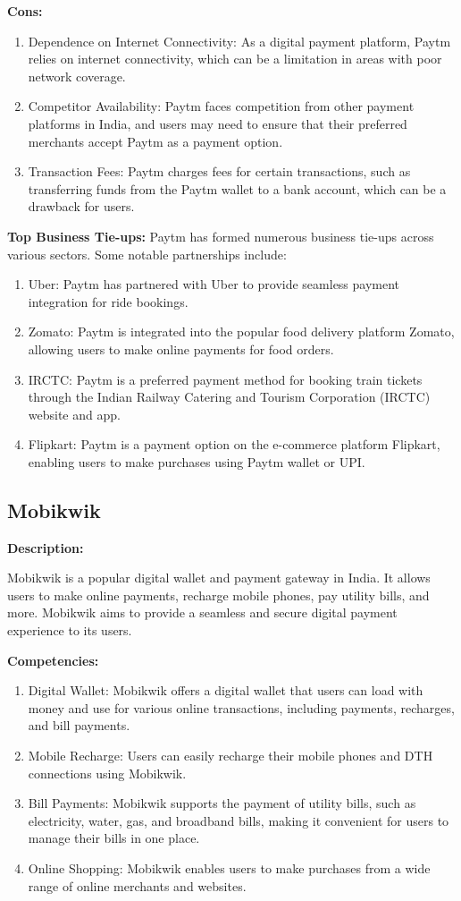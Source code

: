 \textbf{Cons:}
\begin{enumerate}
  \item Dependence on Internet Connectivity: As a digital payment platform, Paytm relies on internet connectivity, which can be a limitation in areas with poor network coverage.
  \item Competitor Availability: Paytm faces competition from other payment platforms in India, and users may need to ensure that their preferred merchants accept Paytm as a payment option.
  \item Transaction Fees: Paytm charges fees for certain transactions, such as transferring funds from the Paytm wallet to a bank account, which can be a drawback for users.
\end{enumerate}

\textbf{Top Business Tie-ups:}
Paytm has formed numerous business tie-ups across various sectors. Some notable partnerships include:
\begin{enumerate}
  \item Uber: Paytm has partnered with Uber to provide seamless payment integration for ride bookings.
  \item Zomato: Paytm is integrated into the popular food delivery platform Zomato, allowing users to make online payments for food orders.
  \item IRCTC: Paytm is a preferred payment method for booking train tickets through the Indian Railway Catering and Tourism Corporation (IRCTC) website and app.
  \item Flipkart: Paytm is a payment option on the e-commerce platform Flipkart, enabling users to make purchases using Paytm wallet or UPI.
\end{enumerate}

\subsection{Mobikwik}

\textbf{Description:}

Mobikwik is a popular digital wallet and payment gateway in India. It allows users to make online payments, recharge mobile phones, pay utility bills, and more. Mobikwik aims to provide a seamless and secure digital payment experience to its users.

\textbf{Competencies:}

\begin{enumerate}
  \item Digital Wallet: Mobikwik offers a digital wallet that users can load with money and use for various online transactions, including payments, recharges, and bill payments.
  \item Mobile Recharge: Users can easily recharge their mobile phones and DTH connections using Mobikwik.
  \item Bill Payments: Mobikwik supports the payment of utility bills, such as electricity, water, gas, and broadband bills, making it convenient for users to manage their bills in one place.
  \item Online Shopping: Mobikwik enables users to make purchases from a wide range of online merchants and websites.
\end{enumerate}

